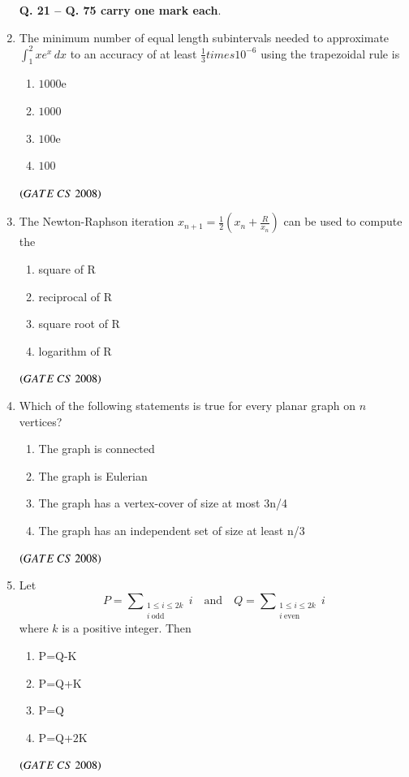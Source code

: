 \documentclass[journal, onecolumn]{IEEEtran}
\numberwithin{equation}{enumi}
\numberwithin{figure}{enumi}
\begin{document}
\begin{enumerate}
\begin{center}
\textbf{Q. 21 -- Q. 75 carry one mark each}.
\end{center}
\item The minimum number of equal length subintervals needed to approximate $\int_{1}^{2} x e^x \,dx$ to an accuracy of at least $\frac{1}{3}times 10^{-6}$ using the trapezoidal rule is
\vspace{-1em}%
\begin{multicols}{4}
\begin{enumerate}
    \item $1000$e
    \item $1000$
    \item $100$e
    \item $100$
\end{enumerate}
\end{multicols}
\hfill $\left(GATE\ CS\  2008\right)$

\item The Newton-Raphson iteration $x_{n+1}=\frac{1}{2}(x_n+\frac{R}{x_n})$ can be used to compute the 
\vspace{-1em}%
\begin{multicols}{2}
\begin{enumerate}
    \item  square of R
    \item reciprocal of R
    \item square root of R
    \item  logarithm of R
\end{enumerate}
\end{multicols}
\hfill $\left(GATE\ CS\  2008\right)$

\item  Which of the following statements is true for every planar graph on $n$ vertices? 
\begin{enumerate}
    \item  The graph is connected
    \item  The graph is Eulerian
    \item  The graph has a vertex-cover of size at most 3n/4
    \item The graph has an independent set of size at least n/3
\end{enumerate}
\hfill $\left(GATE\ CS\  2008\right)$
\bigskip

\item Let \[ P = \sum\nolimits_{\substack{1 \le i \le 2k \\ i\ \text{odd}}} i \quad\text{and}\quad Q = \sum\nolimits_{\substack{1 \le i \le 2k \\ i\ \text{even}}} i \]where \(k\) is a positive integer. Then 
\begin{multicols}{4}
\begin{enumerate}
    \item   P=Q-K
    \item  P=Q+K
    \item  P=Q
    \item  P=Q+$2$K
\end{enumerate}
\hfill $\left(GATE\ CS\  2008\right)$
\end{multicols}


\end{enumerate}
\end{document}
